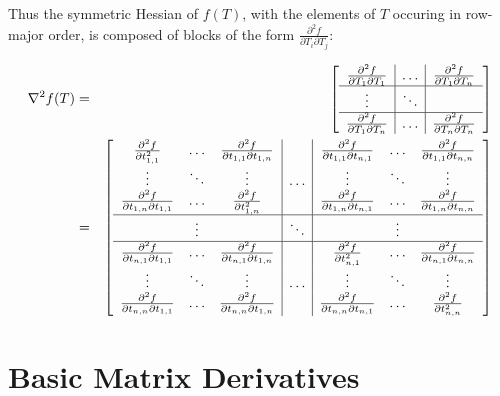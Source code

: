 \documentclass{report}
\begin{document}
Thus the symmetric Hessian of $f(T)$, with the elements of $T$ occuring in row-major order, is composed of blocks of the form $\frac{\partial^2 f}{\partial T_i \partial T_j}$:

\begin{eqnarray}
\nabla^2 f(T) & = &
\left[ \begin{array}{c|c|c}
\frac{\partial^2 f}{\partial T_1 \partial T_1} &
\ldots &
\frac{\partial^2 f}{\partial T_1 \partial T_n} \\
\hline
\vdots & \ddots \\
\hline
\frac{\partial^2 f}{\partial T_1 \partial T_n} & 
\ldots & 
\frac{\partial^2 f}{\partial T_n \partial T_n} \\
\end{array} \right]
\\ & = &
\left[ \begin{array}{ccc|c|ccc}
\frac{\partial^2 f}{\partial t_{1,1}^2} &
\ldots &
\frac{\partial^2 f}{\partial t_{1,1} \partial t_{1,n}} &
&
\frac{\partial^2 f}{\partial t_{1,1} \partial t_{n,1}} &
\ldots &
\frac{\partial^2 f}{\partial t_{1,1} \partial t_{n,n}} \\
\vdots & \ddots & \vdots &
\ldots &
\vdots & \ddots & \vdots \\
\frac{\partial^2 f}{\partial t_{1,n} \partial t_{1,1}} &
\ldots &
\frac{\partial^2 f}{\partial t_{1,n}^2} &
&
\frac{\partial^2 f}{\partial t_{1,n} \partial t_{n,1}} &
\ldots &
\frac{\partial^2 f}{\partial t_{1,n} \partial t_{n,n}} \\
\hline
& \vdots & & \ddots & & \vdots \\
\hline
\frac{\partial^2 f}{\partial t_{n,1} \partial t_{1,1}} &
\ldots &
\frac{\partial^2 f}{\partial t_{n,1} \partial t_{1,n}} &
&
\frac{\partial^2 f}{\partial t_{n,1}^2} &
\ldots &
\frac{\partial^2 f}{\partial t_{n,1} \partial t_{n,n}} \\
\vdots & \ddots & \vdots &
\ldots &
\vdots & \ddots & \vdots \\
\frac{\partial^2 f}{\partial t_{n,n} \partial t_{1,1}} &
\ldots &
\frac{\partial^2 f}{\partial t_{n,n} \partial t_{1,n}} &
&
\frac{\partial^2 f}{\partial t_{n,n} \partial t_{n,1}} &
\ldots &
\frac{\partial^2 f}{\partial t_{n,n}^2} 
\end{array} \right]
\end{eqnarray}

\chapter{Basic Matrix Derivatives}
\end{document}
